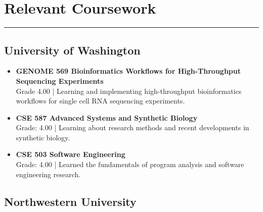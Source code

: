 \documentclass{article}
\begin{document}
\section*{Relevant Coursework}
\hrule
\vspace{10pt}

\subsection*{University of Washington}

\begin{itemize}[leftmargin=1.5in]
    \item[Spring 2025] \textbf{GENOME 569 Bioinformatics Workflows for High-Throughput Sequencing Experiments}\\
    Grade 4.00 | Learning and implementing high-throughput bioinformatics workflows for single cell RNA sequencing experiments.
    \item[Spring 2025] \textbf{CSE 587 Advanced Systems and Synthetic Biology}\\
    Grade: 4.00 | Learning about research methods and recent developments in synthetic biology.
    \item[Winter 2025] \textbf{CSE 503 Software Engineering}\\
    Grade: 4.00 | Learned the fundamentals of program analysis and software engineering research.
\end{itemize}

\subsection*{Northwestern University}
\end{document}

